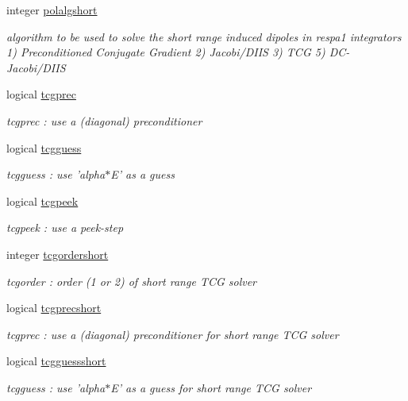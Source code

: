 \begin{DoxyCompactItemize}
integer \hyperlink{classpolpot_ab80e82f537a8a27d27007ece284e55bd}{polalgshort}
\begin{DoxyCompactList}\small\item\em algorithm to be used to solve the short range induced dipoles in respa1 integrators 1) Preconditioned Conjugate Gradient 2) Jacobi/\-D\-I\-I\-S 3) T\-C\-G 5) D\-C-\/\-Jacobi/\-D\-I\-I\-S \end{DoxyCompactList}\item 
logical \hyperlink{classpolpot_aa152fca51bc59dec7f07c1c7a19b1e00}{tcgprec}
\begin{DoxyCompactList}\small\item\em tcgprec \-: use a (diagonal) preconditioner \end{DoxyCompactList}\item 
logical \hyperlink{classpolpot_a5454003eb94f118081671ff0d09104a5}{tcgguess}
\begin{DoxyCompactList}\small\item\em tcgguess \-: use 'alpha$\ast$\-E' as a guess \end{DoxyCompactList}\item 
logical \hyperlink{classpolpot_a72bed485465ab67c11d0767d90af8d8d}{tcgpeek}
\begin{DoxyCompactList}\small\item\em tcgpeek \-: use a peek-\/step \end{DoxyCompactList}\item 
integer \hyperlink{classpolpot_a1af31eaa1c21a3f380709b6088aff0ff}{tcgordershort}
\begin{DoxyCompactList}\small\item\em tcgorder \-: order (1 or 2) of short range T\-C\-G solver \end{DoxyCompactList}\item 
logical \hyperlink{classpolpot_a4edaa232655246d6e72f41f4be85b606}{tcgprecshort}
\begin{DoxyCompactList}\small\item\em tcgprec \-: use a (diagonal) preconditioner for short range T\-C\-G solver \end{DoxyCompactList}\item 
logical \hyperlink{classpolpot_a7b7f20d7e1f0d670a5044c576dc48915}{tcgguessshort}
\begin{DoxyCompactList}\small\item\em tcgguess \-: use 'alpha$\ast$\-E' as a guess for short range T\-C\-G solver \end{DoxyCompactList}\item 

\end{DoxyCompactItemize}

